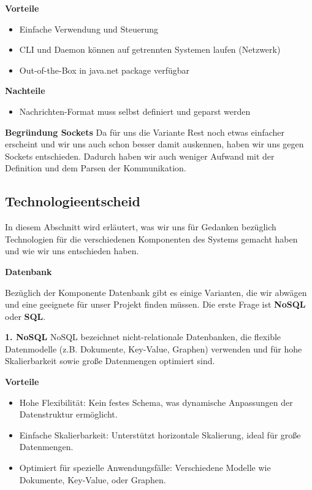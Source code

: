 \documentclass[a4paper,12pt]{report}
\begin{document}
    \textbf{Vorteile}
    \begin{itemize}
        \item Einfache Verwendung und Steuerung
        \item CLI und Daemon können auf getrennten Systemen laufen (Netzwerk)
        \item Out-of-the-Box in java.net package verfügbar
    \end{itemize}

    \textbf{Nachteile}
    \begin{itemize}
        \item Nachrichten-Format muss selbst definiert und geparst werden
    \end{itemize}

    \textbf{Begründung Sockets} Da für uns die Variante Rest noch etwas einfacher erscheint und wir uns auch schon besser
    damit auskennen, haben wir uns gegen Sockets entschieden.
    Dadurch haben wir auch weniger Aufwand mit der Definition und dem Parsen der Kommunikation.

    \subsection{Technologieentscheid}
    In diesem Abschnitt wird erläutert, was wir uns für Gedanken bezüglich Technologien für die verschiedenen Komponenten
    des Systems gemacht haben und wie wir uns entschieden haben.

        {\large\bfseries Datenbank}

    Bezüglich der Komponente Datenbank gibt es einige Varianten, die wir abwägen und eine geeignete für unser Projekt finden müssen.
    Die erste Frage ist \textbf{NoSQL} oder \textbf{SQL}.

    \textbf{1. NoSQL}
    NoSQL bezeichnet nicht-relationale Datenbanken, die flexible Datenmodelle
    (z.B. Dokumente, Key-Value, Graphen) verwenden und für hohe Skalierbarkeit sowie große Datenmengen optimiert sind.

    \textbf{Vorteile}
    \begin{itemize}
        \item Hohe Flexibilität: Kein festes Schema, was dynamische Anpassungen der Datenstruktur ermöglicht.
        \item Einfache Skalierbarkeit: Unterstützt horizontale Skalierung, ideal für große Datenmengen.
        \item Optimiert für spezielle Anwendungsfälle: Verschiedene Modelle wie Dokumente, Key-Value, oder Graphen.
    \end{itemize}
\end{document}
